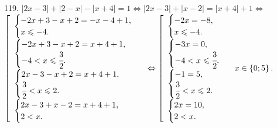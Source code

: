 119. $|2x-3|+|2-x|-|x+4|=1\Leftrightarrow |2x-3|+|x-2|=|x+4|+1\Leftrightarrow$\\$ \left[\begin{array}{l}\begin{cases} -2x+3-x+2=-x-4+1,\\ x\leqslant-4.\end{cases}\\
\begin{cases} -2x+3-x+2=x+4+1,\\ -4<x\leqslant\cfrac{3}{2}.\end{cases}\\ \begin{cases} 2x-3-x+2=x+4+1,\\ \cfrac{3}{2}<x\leqslant2.\end{cases}\\
\begin{cases} 2x-3+x-2=x+4+1,\\ 2< x.\end{cases}\end{array}\right.\Leftrightarrow \left[\begin{array}{l}\begin{cases} -2x=-8,\\ x\leqslant-4.\end{cases}\\
\begin{cases} -3x=0,\\ -4<x\leqslant\cfrac{3}{2}.\end{cases}\\ \begin{cases} -1=5,\\ \cfrac{3}{2}<x\leqslant2.\end{cases}\\
\begin{cases} 2x=10,\\ 2< x.\end{cases}\end{array}\right.
x\in\left\{0;5\right\}.$\\
